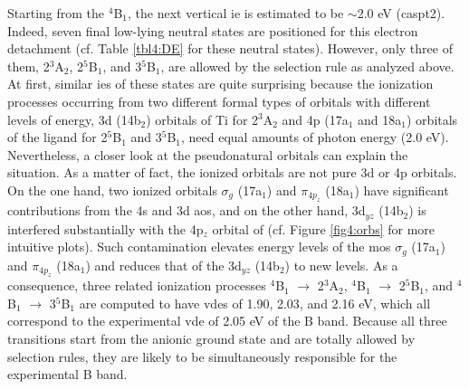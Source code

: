 \begin{refsection}
Starting from the $^4$B$_1$, the next vertical \acrshort{ie} is estimated to be $\sim$2.0 eV (\acrshort{caspt2}). Indeed, seven final low-lying neutral states are positioned for this electron detachment (cf. Table \ref{tbl4:DE} for these neutral states). However, only three of them, 2$^3$A$_2$, 2$^5$B$_1$, and 3$^5$B$_1$, are allowed by the selection rule as analyzed above. At first, similar \acrshort{ie}s of these states are quite surprising because the ionization processes occurring from two different formal types of orbitals with different levels of energy, 3d (14b$_2$) orbitals of Ti for 2$^3$A$_2$ and 4p (17a$_1$ and 18a$_1$) orbitals of the ligand  for 2$^5$B$_1$ and 3$^5$B$_1$, need equal amounts of photon energy (2.0 eV). Nevertheless, a closer look at the pseudonatural orbitals can explain the situation. As a matter of fact, the ionized orbitals are not pure 3d or 4p orbitals. On the one hand, two ionized orbitals $\sigma_g$ (17a$_1$) and $\pi_{4p_z}$ (18a$_1$) have significant contributions from the 4s and 3d \acrshort{ao}s, and on the other hand, 3d$_{yz}$ (14b$_2$) is interfered substantially with the 4p$_z$ orbital of  (cf. Figure \ref{fig4:orbs} for more intuitive plots). Such contamination elevates energy levels of the \acrshort{mo}s $\sigma_g$ (17a$_1$) and $\pi_{4p_z}$ (18a$_1$) and reduces that of the 3d$_{yz}$ (14b$_2$) to new levels. As a consequence, three related ionization processes $^4$B$_1$ $\longrightarrow$ 2$^3$A$_2$, $^4$B$_1$ $\longrightarrow$ 2$^5$B$_1$, and $^4$B$_1$ $\longrightarrow$ 3$^5$B$_1$ are computed to have \acrshort{vde}s of 1.90, 2.03, and 2.16 eV, which all correspond to the experimental \acrshort{vde} of 2.05 eV of the B band. Because all three transitions start from the anionic ground state and are totally allowed by selection rules, they are likely to be simultaneously responsible for the experimental B band.








\end{refsection}
